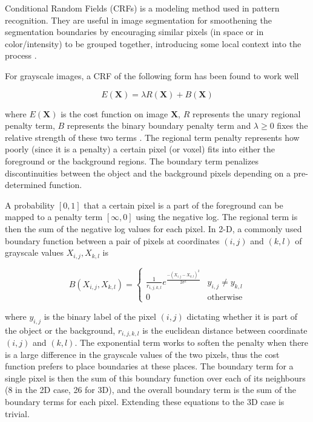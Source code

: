 Conditional Random Fields (CRFs) is a modeling method used in pattern recognition. They are useful in image segmentation for smoothening the segmentation boundaries by encouraging similar pixels (in space or in color/intensity) to be grouped together, introducing some local context into the process \cite{deepIGeoS}.

For grayscale images, a CRF of the following form has been found to work well

\begin{equation}
E(\mathbf{X}) = \lambda R(\mathbf{X}) + B(\mathbf{X})
\label{eq:costFunc}
\end{equation}

where $E(\mathbf{X})$ is the cost function on image $\mathbf{X}$, $R$ represents the unary regional penalty term, $B$ represents the binary boundary penalty term and $\lambda \geq 0$ fixes the relative strength of these two terms \cite{graphCuts}. The regional term penalty represents how poorly (since it is a penalty) a certain pixel (or voxel) fits into either the foreground or the background regions. The boundary term penalizes discontinuities between the object and the background pixels depending on a pre-determined function.

A probability $[0,1]$ that a certain pixel is a part of the foreground can be mapped to a penalty term $[\infty, 0]$ using the negative log. The regional term is then the sum of the negative log values for each pixel. In 2-D, a commonly used boundary function between a pair of pixels at coordinates $(i,j)$ and $(k,l)$ of grayscale values $X_{i,j}, X_{k,l}$ is

\begin{equation} B(X_{i,j}, X_{k,l}) = \begin{cases} 
      \frac{1}{r_{i,j,k,l}} e^{\frac{-(X_{i,j}-X_{k,l})^2}{2\sigma^2}} & y_{i,j} \neq y_{k,l} \\
      0 & \text{otherwise}
   \end{cases}
   \label{eq:boundTerm}
\end{equation}

where $y_{i,j}$ is the binary label of the pixel $(i,j)$ dictating whether it is part of the object or the background, $r_{i,j,k,l}$ is the euclidean distance between coordinate $(i,j)$ and $(k,l)$. The exponential term works to soften the penalty when there is a large difference in the grayscale values of the two pixels, thus the cost function prefers to place boundaries at these places. The boundary term for a single pixel is then the sum of this boundary function over each of its neighbours (8 in the 2D case, 26 for 3D), and the overall boundary term is the sum of the boundary terms for each pixel. Extending these equations to the 3D case is trivial.